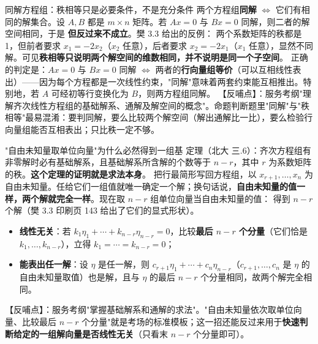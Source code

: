 \begin{fdeep}{同解方程组：秩相等只是必要条件，不是充分条件}
两个方程组\textbf{同解} $\iff$ 它们有相同的解集合。设 $A,B$ 都是 $m\times n$ 矩阵。若 $Ax=0$ 与 $Bx=0$ 同解，则二者的解空间相同，于是
\textbf{但反过来不成立}。樊 3.3 给出的反例：
两个系数矩阵的秩都是 1，但前者要求 $x_1=-2x_2$（$x_2$ 任意），后者要求 $x_2=-2x_1$（$x_1$ 任意），显然不同解。可见\textbf{秩相等只说明两个解空间的维数相同，并不说明是同一个子空间}。
正确的判定是：$Ax=0$ 与 $Bx=0$ 同解 $\iff$ 两者的\textbf{行向量组等价}（可以互相线性表出）——因为每个方程都是一次线性约束，"同解"意味着两套约束能互相推出。特别地，若 $A$ 可经初等行变换化为 $B$，则两方程组同解。
【反哺点】：服务考纲"理解齐次线性方程组的基础解系、通解及解空间的概念"。命题判断题里"同解"与"秩相等"最易混淆：要判同解，要么比较两个解空间（解出通解比一比），要么检验行向量组能否互相表出；只比秩一定不够。
\end{fdeep}

\begin{fdeep}{"自由未知量取单位向量"为什么必然得到一组基}
定理（北大 三.6）：齐次方程组有非零解时必有基础解系，且基础解系所含解的个数等于 $n-r$，其中 $r$ 为系数矩阵的秩。\textbf{这个定理的证明就是求法本身}。
把行最简形写回方程组，以 $x_{r+1},\dots,x_n$ 为自由未知量。任给它们一组值就唯一确定一个解；换句话说，\textbf{自由未知量的值一样，两个解就完全一样}。现在取 $n-r$ 组单位向量当自由未知量的值：
得到 $n-r$ 个解（樊 3.3 印刷页 143 给出了它们的显式形状）。
\begin{itemize}[leftmargin=2.2em,itemsep=0.25em]
\item \textbf{线性无关}：若 $k_1\eta_1+\cdots+k_{n-r}\eta_{n-r}=0$，比较\textbf{最后 $n-r$ 个分量}（它们恰是 $k_1,\dots,k_{n-r}$），立得 $k_1=\cdots=k_{n-r}=0$；
\item \textbf{能表出任一解}：设 $\eta$ 是任一解，则 $c_{r+1}\eta_1+\cdots+c_n\eta_{n-r}$（$c_{r+1},\dots,c_n$ 是 $\eta$ 的自由未知量取值）也是解，且与 $\eta$ 的最后 $n-r$ 个分量相同，故两个解完全相同。
\end{itemize}
【反哺点】：服务考纲"掌握基础解系和通解的求法"。"自由未知量依次取单位向量、比较最后 $n-r$ 个分量"就是考场的标准模板；这一招还能反过来用于\textbf{快速判断给定的一组解向量是否线性无关}（只看末 $n-r$ 个分量即可）。
\end{fdeep}

